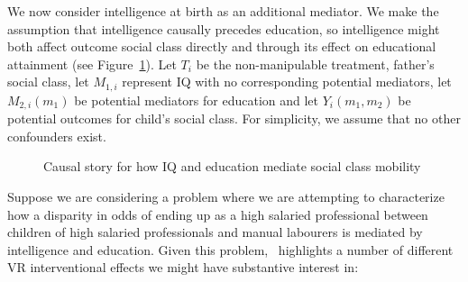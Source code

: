 We now consider intelligence at birth as an 
additional mediator. We make the assumption that intelligence causally precedes education, so 
intelligence might both affect outcome social class directly and through its effect on educational 
attainment (see Figure~\ref{fig:application_DAG}). Let $T_{i}$ be the non-manipulable treatment, 
father's social class, let $M_{1,i}$ represent IQ with no 
corresponding potential mediators, let $M_{2,i}(m_{1})$ be potential mediators for 
education and let $Y_{i}(m_{1},m_{2})$ be potential outcomes for child's social class. 
For simplicity, we assume that no other confounders exist.

\begin{figure}
\centering
{}
\caption{Causal story for how IQ and education mediate social class mobility}
\label{fig:application_DAG}
\end{figure}

Suppose we are considering a problem where we are attempting to characterize how a disparity in odds 
of ending up as a high salaried professional between children of high salaried professionals and 
manual labourers is mediated by intelligence and education. 
Given this problem,~\cite{jacksonvanderweele2018} highlights a number of different VR interventional effects
we might have substantive interest in:

